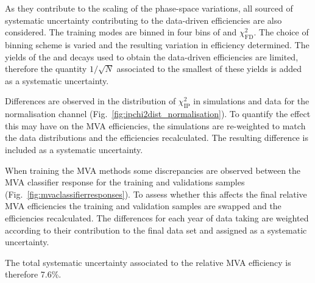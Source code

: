 \begin{description}
As they contribute to the scaling of the phase-space variations, all sourced of systematic uncertainty contributing to the data-driven efficiencies are also considered. The training modes are binned in four bins of \pt and $\chi^{2}_{\text{FD}}$. The choice of binning scheme is varied and the resulting variation in efficiency determined. The yields of the \decay{\Bs}{\jpsi\phiz} and \decay{\Bsb}{\Dsp\pim} decays used to obtain the data-driven efficiencies are limited, therefore the quantity $1/\sqrt{N}$ associated to the smallest of these yields is added as a systematic uncertainty. 

Differences are observed in the distribution of $\chi^{2}_{\text{IP}}$ in simulations and data for the normalisation channel (Fig.~\ref{fig:ipchi2dist_normalisation}). To quantify the effect this may have on the MVA efficiencies, the simulations are re-weighted to match the data distributions and the efficiencies recalculated. The resulting difference is included as a systematic uncertainty.

When training the MVA methods some discrepancies are observed between the MVA classifier response for the training and validations samples (Fig.~\ref{fig:mvaclassifierresponses}). To assess whether this affects the final relative MVA efficiencies the training and validation samples are swapped and the efficiencies recalculated. The differences for each year of data taking are weighted according to their contribution to the final data set and assigned as a systematic uncertainty.  

The total systematic uncertainty associated to the relative MVA efficiency is therefore 7.6\%. 
\end{description}



